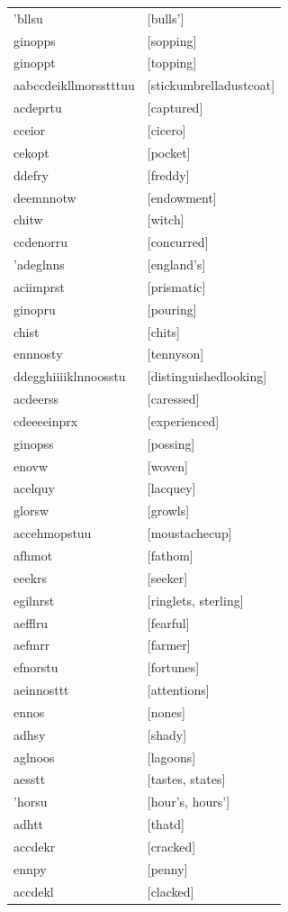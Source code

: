 \documentclass{article}
\begin{document}
\begin{tabular}{ll}
'bllsu & [bulls'] \\
ginopps & [sopping] \\
ginoppt & [topping] \\
aabccdeikllmorsstttuu & [stickumbrelladustcoat] \\
acdeprtu & [captured] \\
cceior & [cicero] \\
cekopt & [pocket] \\
ddefry & [freddy] \\
deemnnotw & [endowment] \\
chitw & [witch] \\
ccdenorru & [concurred] \\
'adeglnns & [england's] \\
aciimprst & [prismatic] \\
ginopru & [pouring] \\
chist & [chits] \\
ennnosty & [tennyson] \\
ddegghiiiiklnnoosstu & [distinguishedlooking] \\
acdeerss & [caressed] \\
cdeeeeinprx & [experienced] \\
ginopss & [possing] \\
enovw & [woven] \\
acelquy & [lacquey] \\
glorsw & [growls] \\
accehmopstuu & [moustachecup] \\
afhmot & [fathom] \\
eeekrs & [seeker] \\
egilnrst & [ringlets, sterling] \\
aefflru & [fearful] \\
aefmrr & [farmer] \\
efnorstu & [fortunes] \\
aeinnosttt & [attentions] \\
ennos & [nones] \\
adhsy & [shady] \\
aglnoos & [lagoons] \\
aesstt & [tastes, states] \\
'horsu & [hour's, hours'] \\
adhtt & [thatd] \\
accdekr & [cracked] \\
ennpy & [penny] \\
accdekl & [clacked] \\

\end{tabular}
\end{document}
